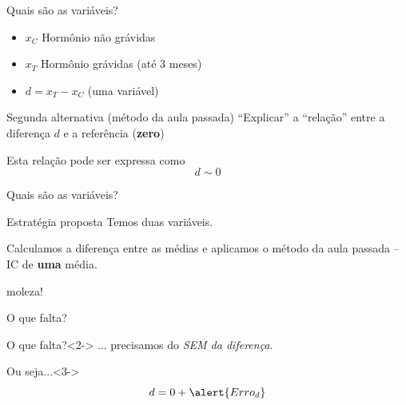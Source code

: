 \documentclass{beamer}
\begin{document}
\begin{frame}{\scriptsize Quais são as variáveis?}
  \begin{itemize}
    \footnotesize
  \item $x_C$ Hormônio não grávidas
  \item $x_T$ Hormônio grávidas (até 3 meses)
  \item $d = x_T - x _C$ (uma variável)
  \end{itemize}
  \begin{block}{Segunda alternativa (método da aula passada)}
    \footnotesize
    ``Explicar'' a ``relação'' entre a diferença $d$ e a referência ({\bf zero})
  \end{block}
  \begin{block}{Esta relação pode ser expressa como}
    \footnotesize
    \begin{displaymath}
      d \sim 0
    \end{displaymath}
  \end{block}
\end{frame}

\begin{frame}{\scriptsize Quais são as variáveis?}
  \begin{block}{Estratégia proposta}
    \footnotesize
    Temos duas variáveis.

    \bigskip
    Calculamos a \alert{diferença} entre as médias e aplicamos o método da aula passada -- IC de {\bf uma} média.

    \begin{center}
      moleza!
    \end{center}
  \end{block}
  \begin{center}
    \footnotesize
    O que falta?
  \end{center}
  \begin{block}{O que falta?}<2->
    ... precisamos do {\em SEM da diferença}.
  \end{block}
  \begin{block}{Ou seja...}<3->
    \begin{displaymath}
      d = 0 + \alert{Erro_d}
    \end{displaymath}
  \end{block}

\end{frame}
\end{document}
